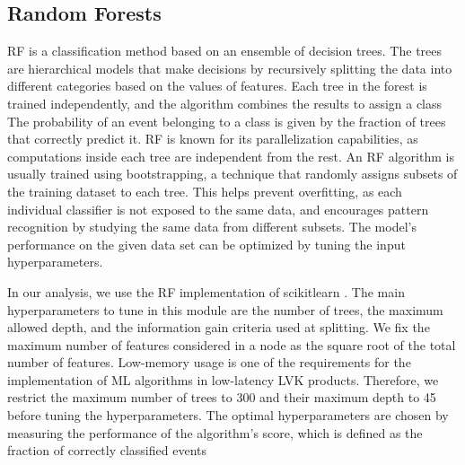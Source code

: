 \subsection*{Random Forests}

\ac{RF} is a classification method based on an ensemble of decision trees. The trees are hierarchical models that make decisions by recursively splitting the data into different
categories based on the values of features. Each tree in the forest is trained independently, and the algorithm combines the results to assign a class  The probability of an event belonging to a class is given by the fraction of trees that
correctly predict it. \ac{RF} is known for its parallelization capabilities, as computations inside each tree are independent from the rest. An \ac{RF} algorithm is usually trained using
bootstrapping, a technique that randomly assigns subsets of the training dataset to each tree. This helps prevent overfitting, as each individual classifier is not exposed to the same
data, and encourages pattern recognition by studying the same data from different subsets. The model's performance on the given data set can be optimized by tuning the input
hyperparameters.

In our analysis, we use the \ac{RF} implementation of scikitlearn \cite{Pedregosa:2011}. The main hyperparameters to tune in this module are the number of trees, the maximum allowed depth, and the information gain criteria used at splitting.  We fix the maximum number of features considered in a node  as the square root of the total number of features. Low-memory usage is one of the requirements for the implementation of \ac{ML} algorithms in low-latency \ac{LVK} products. Therefore, we restrict the maximum number of trees to 300 and their maximum depth to 45 before tuning the hyperparameters. The optimal hyperparameters are chosen by measuring the performance of the algorithm's score, which is defined as the fraction of correctly classified events 


 



